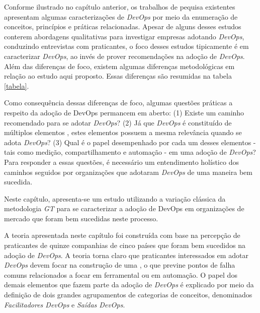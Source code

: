 Conforme ilustrado no capítulo anterior, os trabalhos de pequisa existentes
apresentam algumas caracterizações de \textit{DevOps} por meio da enumeração
de conceitos, princípios e práticas relacionadas. Apesar de alguns desses
estudos conterem abordagens qualitativas para investigar empresas adotando
\textit{DevOps}, conduzindo entrevistas com praticantes, o foco desses estudos
tipicamente é em caracterizar \textit{DevOps}, ao invés de prover recomendações
na adoção de \textit{DevOps}. Além das diferenças de foco, existem algumas
diferenças metodológicas em relação ao estudo aqui proposto. Essas diferenças
são resumidas na tabela \ref{tabela}.

Como consequência dessas diferenças de foco, algumas questões práticas a
respeito da adoção de DevOps permancem em aberto: (1) Existe um caminho
recomendado para se adotar \textit{DevOps}? (2) Já que \textit{DevOps} é
constituído de múltiplos elementos \cite{dimensions_of_devops}, estes elementos
possuem a mesma relevância quando se adota \textit{DevOps}? (3) Qual é o papel
desempenhado por cada um desses elementos - tais como medição, compartilhamento e
automação - em uma adoção de \textit{DevOps}? Para responder a essas questões,
é necessário um entendimento holístico dos caminhos seguidos por organizações
que adotaram \textit{DevOps} de uma maneira bem sucedida.

Neste capítulo, apresenta-se um estudo utilizando a variação clássica da
metodologia \textit{\acrfull{GT}} para se caracterizar a adoção de DevOps
em organizações de mercado que foram bem sucedidas neste processo.

A teoria apresentada neste capítulo foi construída com base na percepção de
praticantes de quinze companhias de cinco países que foram bem sucedidos na
adoção de \textit{DevOps}. A teoria torna claro que praticantes interessados em
adotar \textit{DevOps} devem focar na construção de uma , o que previne pontos de falha comuns relacionados a focar em
ferramental ou em automação. O papel dos demais elementos que fazem parte da
adoção de \textit{DevOps} é explicado por meio da definição de dois grandes
agrupamentos de categorias de conceitos, denominados \emph{Facilitadores DevOps}
e \emph{Saídas DevOps}.


